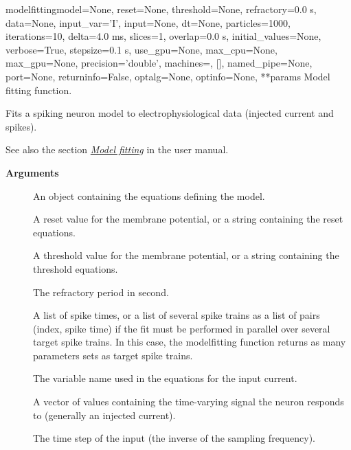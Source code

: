 \documentclass[letterpaper,10pt,english]{manual}
\begin{document}
\hypertarget{brian.library.modelfitting.modelfitting}{}\begin{funcdesc}{modelfitting}{model=None, reset=None, threshold=None, refractory=0.0 s, data=None, input\_var='I', input=None, dt=None, particles=1000, iterations=10, delta=4.0 ms, slices=1, overlap=0.0 s, initial\_values=None, verbose=True, stepsize=0.1 s, use\_gpu=None, max\_cpu=None, max\_gpu=None, precision='double', machines=, {[}{]}, named\_pipe=None, port=None, returninfo=False, optalg=None, optinfo=None, **params}
Model fitting function.

Fits a spiking neuron model to electrophysiological data (injected current and spikes).

See also the section \hyperlink{model-fitting-library}{\emph{Model fitting}} in the user manual.

\textbf{Arguments}
\begin{description}
\item[] \leavevmode
An \hyperlink{brian.Equations}{} object containing the equations defining the model.

\item[] \leavevmode
A reset value for the membrane potential, or a string containing the reset
equations.

\item[] \leavevmode
A threshold value for the membrane potential, or a string containing the threshold
equations.

\item[] \leavevmode
The refractory period in second.

\item[] \leavevmode
A list of spike times, or a list of several spike trains as a list of pairs (index, spike time)
if the fit must be performed in parallel over several target spike trains. In this case,
the modelfitting function returns as many parameters sets as target spike trains.

\item[] \leavevmode
The variable name used in the equations for the input current.

\item[] \leavevmode
A vector of values containing the time-varying signal the neuron responds to (generally
an injected current).

\item[] \leavevmode
The time step of the input (the inverse of the sampling frequency).


\end{description}
\end{funcdesc}
\end{document}
